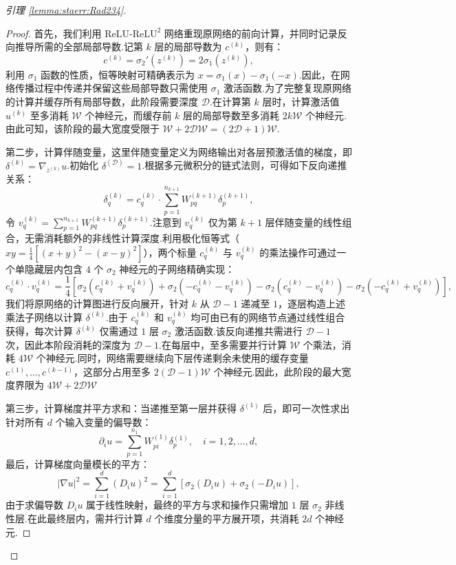 \begin{proof}[引理 \ref{lemma:staerr:Rad234}]
\begin{proof}
首先，我们利用 $\mathrm{ReLU}$-$\mathrm{ReLU}^{2}$ 网络重现原网络的前向计算，并同时记录反向推导所需的全部局部导数.记第 $k$ 层的局部导数为 $c^{(k)}$，则有：
$$c^{(k)} = \sigma_2'(z^{(k)}) = 2\sigma_1(z^{(k)}),$$
利用 $\sigma_1$ 函数的性质，恒等映射可精确表示为 $x = \sigma_1(x) - \sigma_1(-x)$.因此，在网络传播过程中传递并保留这些局部导数只需使用 $\sigma_1$ 激活函数.为了完整复现原网络的计算并缓存所有局部导数，此阶段需要深度 $\mathcal{D}$.在计算第 $k$ 层时，计算激活值 $u^{(k)}$ 至多消耗 $\mathcal{W}$ 个神经元，而缓存前 $k$ 层的局部导数至多消耗 $2k\mathcal{W}$ 个神经元.由此可知，该阶段的最大宽度受限于 $\mathcal{W} + 2\mathcal{D}\mathcal{W} = (2\mathcal{D}+1)\mathcal{W}$.

第二步，计算伴随变量，这里伴随变量定义为网络输出对各层预激活值的梯度，即 $\delta^{(k)} = \nabla_{z^{(k)}} u$.初始化 $\delta^{(\mathcal{D})} = 1$.根据多元微积分的链式法则，可得如下反向递推关系：
$$\delta_q^{(k)} = c_q^{(k)} \cdot \sum_{p=1}^{n_{k+1}} W_{pq}^{(k+1)} \delta_p^{(k+1)},$$
令 $v_q^{(k)} = \sum_{p=1}^{n_{k+1}} W_{pq}^{(k+1)} \delta_p^{(k+1)}$.注意到 $v_q^{(k)}$ 仅为第 $k+1$ 层伴随变量的线性组合，无需消耗额外的非线性计算深度.利用极化恒等式（$xy=\frac{1}{4}\left[(x+y)^2-(x-y)^2\right]$），两个标量 $c_q^{(k)}$ 与 $v_q^{(k)}$ 的乘法操作可通过一个单隐藏层内包含 $4$ 个 $\sigma_2$ 神经元的子网络精确实现：
$$c_q^{(k)} \cdot v_q^{(k)} = \frac{1}{4}\left[\sigma_2(c_q^{(k)}+v_q^{(k)}) + \sigma_2(-c_q^{(k)}-v_q^{(k)}) - \sigma_2(c_q^{(k)}-v_q^{(k)}) - \sigma_2(-c_q^{(k)}+v_q^{(k)})\right],$$
我们将原网络的计算图进行反向展开，针对 $k$ 从 $\mathcal{D}-1$ 递减至 $1$，逐层构造上述乘法子网络以计算 $\delta^{(k)}$.由于 $c_q^{(k)}$ 和 $v_q^{(k)}$ 均可由已有的网络节点通过线性组合获得，每次计算 $\delta^{(k)}$ 仅需通过 $1$ 层 $\sigma_2$ 激活函数.该反向递推共需进行 $\mathcal{D}-1$ 次，因此本阶段消耗的深度为 $\mathcal{D}-1$.在每层中，至多需要并行计算 $\mathcal{W}$ 个乘法，消耗 $4\mathcal{W}$ 个神经元.同时，网络需要继续向下层传递剩余未使用的缓存变量 $c^{(1)}, \dots, c^{(k-1)}$，这部分占用至多 $2(\mathcal{D}-1)\mathcal{W}$ 个神经元.因此，此阶段的最大宽度界限为 $4\mathcal{W} + 2\mathcal{D}\mathcal{W}$

第三步，计算梯度并平方求和：当递推至第一层并获得 $\delta^{(1)}$ 后，即可一次性求出针对所有 $d$ 个输入变量的偏导数：
$$\partial_i u = \sum_{p=1}^{n_1} W_{pi}^{(1)} \delta_p^{(1)}, \quad i=1, 2, \dots, d,$$
最后，计算梯度向量模长的平方：
$$|\nabla u|^2 = \sum_{i=1}^d (D_i u)^2 = \sum_{i=1}^d \left[ \sigma_2(D_i u) + \sigma_2(-D_i u) \right],$$
由于求偏导数 $D_iu$ 属于线性映射，最终的平方与求和操作只需增加 $1$ 层 $\sigma_2$ 非线性层.在此最终层内，需并行计算 $d$ 个维度分量的平方展开项，共消耗 $2d$ 个神经元.


\end{proof}
\end{proof}
